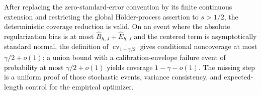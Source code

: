 After replacing the zero-standard-error convention by its finite continuous extension and restricting the global Hölder-process assertion to \(s>1/2\), the deterministic coverage reduction is valid. On an event where the absolute regularization bias is at most \(\widehat B_{h,J}+\widehat E_{h,J}\) and the centered term is asymptotically standard normal, the definition of \(\operatorname{cv}_{1-\gamma/2}\) gives conditional noncoverage at most \(\gamma/2+o(1)\); a union bound with a calibration-envelope failure event of probability at most \(\gamma/2+o(1)\) yields coverage \(1-\gamma-o(1)\). The missing step is a uniform proof of those stochastic events, variance consistency, and expected-length control for the empirical optimizer.